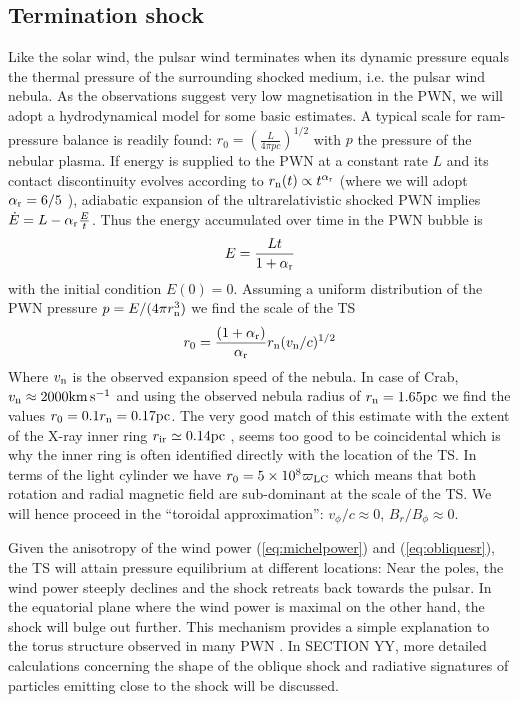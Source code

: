 \subsection{Termination shock}

Like the solar wind, the pulsar wind terminates when its dynamic pressure equals the thermal pressure of the surrounding shocked medium, i.e. the pulsar wind nebula.  
As the observations suggest very low magnetisation in the PWN, we will adopt a hydrodynamical model for some basic estimates.  A typical scale for ram-pressure balance is readily found: $r_0=\left(\frac{L}{4\pi p c}\right)^{1/2}$ with $p$ the pressure of the nebular plasma.  If energy is supplied to the PWN at a constant rate $L$ and its contact discontinuity evolves according to $r_{\rm n}(t)\propto t^{\alpha_{\rm r}}$ (where we will adopt $\alpha_{\rm r}=6/5$ \citep{Chevalier1977}), adiabatic expansion of the ultrarelativistic shocked PWN implies $\dot{E} = L-\alpha_{\rm r}\frac{E}{t}$.  Thus the energy accumulated over time in the PWN bubble is
\begin{align}
E= \frac{L t}{1+\alpha_{\rm r}}
\end{align}
with the initial condition $E(0)=0$. Assuming a uniform distribution of the PWN pressure $p=E/(4\pi r_{\rm n}^3)$ we find the scale of the TS
\begin{align}
r_0 = \frac{(1+\alpha_{\rm r})}{\alpha_{\rm r}} r_{\rm n}(v_{\rm n}/c)^{1/2}
\label{eq:rtshydro}
\end{align}
Where $v_{\rm n}$ is the observed expansion speed of the nebula. In case of Crab, $v_{\rm n}\approx 2000 \rm km\, s^{-1}$ and using the observed nebula radius of  $r_{\rm n}=1.65\rm pc$ \citep{hester2008} we find the values $r_0=0.1 r_{\rm n}=0.17\rm pc$.  
The very good match of this estimate with the extent of the X-ray inner ring $r_{\rm ir}\simeq 0.14\rm pc$ \citep{weisskopf2000}, seems too good to be coincidental which is why the inner ring is often identified directly with the location of the TS.   
In terms of the light cylinder we have $r_0=5\times 10^8 \varpi_{\rm LC}$ which means that both rotation and radial magnetic field  are sub-dominant at the scale of the TS.  We will hence proceed in the ``toroidal approximation'': $v_\phi/c\approx 0$, $B_r/B_\phi \approx0$.  

Given the anisotropy of the wind power (\ref{eq:michelpower}) and (\ref{eq:obliquesr}), the TS will attain pressure equilibrium at different locations:  
Near the poles, the wind power steeply declines and the shock retreats back towards the pulsar.  In the equatorial plane where the wind power is maximal on the other hand, the shock will bulge out further.  This mechanism provides a simple explanation to the torus structure observed in many PWN \citep{lyubarsky2002}.   In SECTION YY, more detailed calculations concerning the shape of the oblique shock and radiative signatures of particles emitting close to the shock will be discussed.  

